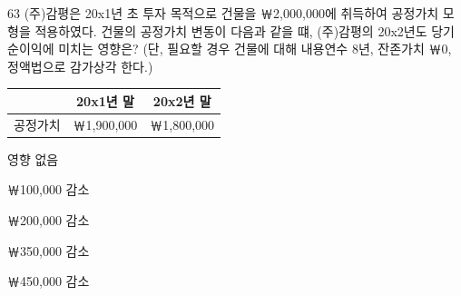 \begin{question}{63}
(주)감평은 20x1년 초 투자 목적으로 건물을 ￦2,000,000에 취득하여 공정가치 모형을 적용하였다. 건물의 공정가치 변동이 다음과 같을 떄, (주)감평의 20x2년도 당기순이익에 미치는 영향은? (단, 필요할 경우 건물에 대해 내용연수 8년, 잔존가치 ￦0, 정액법으로 감가상각 한다.)
\par{\small\centering
\begin{tabular}{|c|c|c|}
\hline
 & 20x1년 말 & 20x2년 말 \\ \hline
공정가치 & ￦1,900,000 & ￦1,800,000 \\ \hline
\end{tabular}\par}
\begin{choices}
  \item 영향 없음
  \item ￦100,000 감소
  \item ￦200,000 감소
  \item ￦350,000 감소
  \item ￦450,000 감소
\end{choices}
\end{question}
